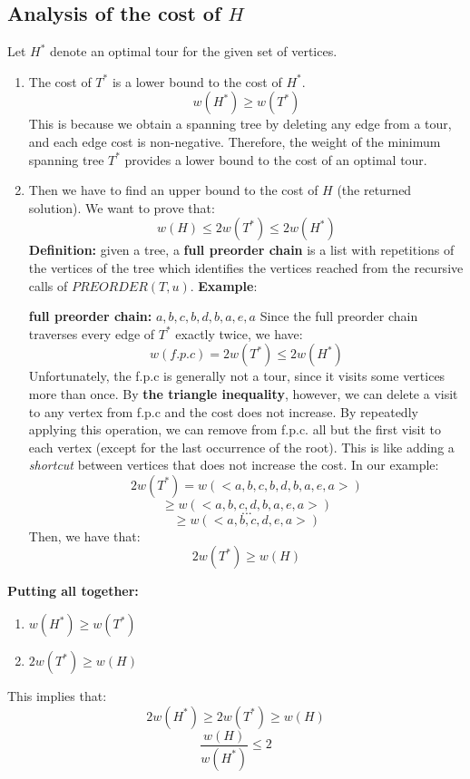 \subsection{Analysis of the cost of $H$}
Let $H^*$ denote an optimal tour for the given set of vertices.
\begin{enumerate}
    \item The cost of $T^*$ is a lower bound to the cost of $H^*$.
    \[w(H^*) \geq w(T^*)\]
    This is because we obtain a spanning tree by deleting any edge from a tour, and each edge cost is non-negative. Therefore, the weight of the minimum spanning tree $T^*$ provides a lower bound to the cost of an optimal tour.

    \item  Then we have to find an upper bound to the cost of $H$ (the returned solution). We want to prove that:
    \[w(H) \leq 2w(T^*) \leq 2w(H^*)\]
    \textbf{Definition:} given a tree, a \textbf{full preorder chain} is a list with repetitions of the vertices of the tree which identifies the vertices reached from the recursive calls of $PREORDER(T, u)$.\newline\newline
    \textbf{Example}:\newline\newline
    \newline\newline
    \textbf{full preorder chain:} $a, b, c, b, d, b, a, e, a$\newline\newline
    Since the full preorder chain traverses every edge of $T^*$ exactly twice, we have:
    \[w(f.p.c) = 2w(T^*) \leq 2w(H^*)\]
    Unfortunately, the f.p.c is generally not a tour, since it visits some vertices more than once. By \textbf{the triangle inequality}, however, we can delete a visit to any vertex from f.p.c and the cost does not increase. By repeatedly applying this operation, we can remove from f.p.c. all but the first visit to each vertex (except for the last occurrence of the root). This is like adding a \textit{shortcut} between vertices that does not increase the cost. In our example:
    \[2w(T^*) = w(<a, b, c, b, d, b, a, e, a>)\]
    \[\geq w(<a, b, c, d, b, a, e, a>)\]
    \[ ... \]
    \[\geq w(<a, b, c, d ,e, a>)\]
    Then, we have that:
    \[2w(T^*) \geq w(H)\]
\end{enumerate}
\textbf{Putting all together:}
\begin{enumerate}
    \item $w(H^*) \geq w(T^*)$
    \item $2w(T^*) \geq w(H)$
\end{enumerate}
This implies that:
\[2w(H^*) \geq 2w(T^*) \geq w(H)\]
\[\frac{w(H)}{w(H^*)} \leq 2\]

